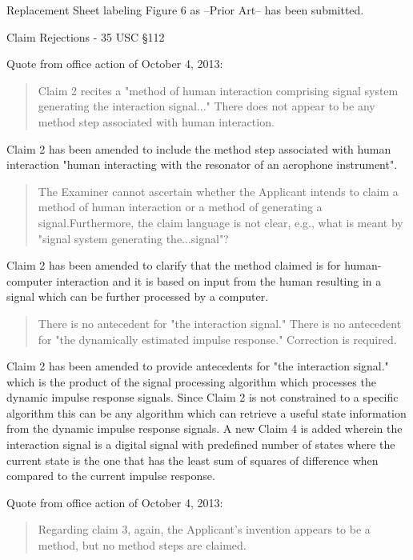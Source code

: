 Replacement Sheet labeling Figure 6 as --Prior Art-- has been submitted.

Claim Rejections - 35 USC  \S 112

Quote from office action of October 4, 2013:

\begin{quote}
Claim 2 recites a
"method of human interaction comprising signal system generating the interaction
signal..." There does not appear to be any method step associated with human
interaction.
\end{quote}

Claim 2 has been amended to include the method step associated with human interaction "human interacting with the resonator of an aerophone instrument".

\begin{quote}
The Examiner cannot ascertain whether the Applicant intends to claim a
method of human interaction or a method of generating a signal.Furthermore, the
claim language is not clear, e.g., what is meant by "signal system generating
the...signal"?
\end{quote}

Claim 2 has been amended to clarify that the method claimed is for human-computer interaction and it is based on input from the human resulting in a signal which can be further processed by a computer.

\begin{quote}
There is no antecedent for "the interaction signal." There is no
antecedent for "the dynamically estimated impulse response." Correction is required.
\end{quote}

Claim 2 has been amended to provide antecedents for "the interaction signal." which is the product of the signal processing algorithm which processes the dynamic impulse response signals. Since Claim 2 is not constrained to a specific algorithm this can be any algorithm which can retrieve a useful state information from the dynamic impulse response signals. A new Claim 4 is added wherein the interaction signal is a digital signal with predefined number of states where the current state is the one that has the least sum of squares of difference when compared to the current impulse response.

Quote from office action of October 4, 2013:

\begin{quote}
Regarding claim 3, again, the Applicant's invention appears to be a method, but no
method steps are claimed.
\end{quote}

